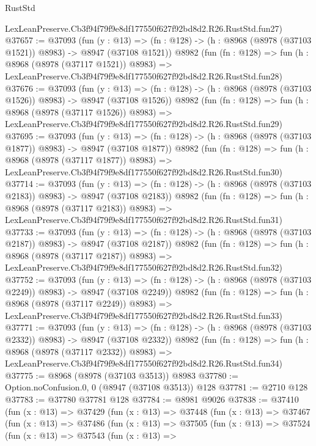 \begin{lexlean}{RustStd}
\begin{coremodule}
    LexLeanPreserve.Cb3f94f79f9e8df177550f627f92bd8d2.R26.RustStd.fun27)
@37657 := @37093
    (fun (y : @13) =>
    (fn : @128) -> (h : @8968 (@8978 (@37103 @1521)) @8983) -> @8947 (@37108 @1521))
    @8982
    (fun (fn : @128) =>
    fun (h : @8968 (@8978 (@37117 @1521)) @8983) =>
    LexLeanPreserve.Cb3f94f79f9e8df177550f627f92bd8d2.R26.RustStd.fun28)
@37676 := @37093
    (fun (y : @13) =>
    (fn : @128) -> (h : @8968 (@8978 (@37103 @1526)) @8983) -> @8947 (@37108 @1526))
    @8982
    (fun (fn : @128) =>
    fun (h : @8968 (@8978 (@37117 @1526)) @8983) =>
    LexLeanPreserve.Cb3f94f79f9e8df177550f627f92bd8d2.R26.RustStd.fun29)
@37695 := @37093
    (fun (y : @13) =>
    (fn : @128) -> (h : @8968 (@8978 (@37103 @1877)) @8983) -> @8947 (@37108 @1877))
    @8982
    (fun (fn : @128) =>
    fun (h : @8968 (@8978 (@37117 @1877)) @8983) =>
    LexLeanPreserve.Cb3f94f79f9e8df177550f627f92bd8d2.R26.RustStd.fun30)
@37714 := @37093
    (fun (y : @13) =>
    (fn : @128) -> (h : @8968 (@8978 (@37103 @2183)) @8983) -> @8947 (@37108 @2183))
    @8982
    (fun (fn : @128) =>
    fun (h : @8968 (@8978 (@37117 @2183)) @8983) =>
    LexLeanPreserve.Cb3f94f79f9e8df177550f627f92bd8d2.R26.RustStd.fun31)
@37733 := @37093
    (fun (y : @13) =>
    (fn : @128) -> (h : @8968 (@8978 (@37103 @2187)) @8983) -> @8947 (@37108 @2187))
    @8982
    (fun (fn : @128) =>
    fun (h : @8968 (@8978 (@37117 @2187)) @8983) =>
    LexLeanPreserve.Cb3f94f79f9e8df177550f627f92bd8d2.R26.RustStd.fun32)
@37752 := @37093
    (fun (y : @13) =>
    (fn : @128) -> (h : @8968 (@8978 (@37103 @2249)) @8983) -> @8947 (@37108 @2249))
    @8982
    (fun (fn : @128) =>
    fun (h : @8968 (@8978 (@37117 @2249)) @8983) =>
    LexLeanPreserve.Cb3f94f79f9e8df177550f627f92bd8d2.R26.RustStd.fun33)
@37771 := @37093
    (fun (y : @13) =>
    (fn : @128) -> (h : @8968 (@8978 (@37103 @2332)) @8983) -> @8947 (@37108 @2332))
    @8982
    (fun (fn : @128) =>
    fun (h : @8968 (@8978 (@37117 @2332)) @8983) =>
    LexLeanPreserve.Cb3f94f79f9e8df177550f627f92bd8d2.R26.RustStd.fun34)
@37775 := @8968 (@8978 (@37103 @3513)) @8983
@37780 := Option.noConfusion.{0, 0} (@8947 (@37108 @3513)) @128
@37781 := @2710 @128
@37783 := @37780 @37781 @128
@37784 := @8981 @9026
@37838 := @37410
    (fun (x : @13) =>
    @37429
      (fun (x : @13) =>
      @37448
        (fun (x : @13) =>
        @37467
          (fun (x : @13) =>
          @37486
            (fun (x : @13) =>
            @37505
              (fun (x : @13) =>
              @37524
                (fun (x : @13) =>
                @37543
                  (fun (x : @13) =>

\end{coremodule}
\end{lexlean}
